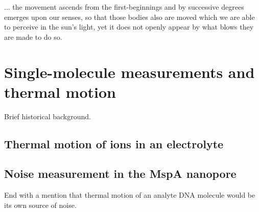 \begin{savequote}[75mm]
... the movement ascends from the first-beginnings and by successive degrees emerges upon our senses, so that those bodies also are moved which we are able to perceive in the sun's light, yet it does not openly appear by what blows they are made to do so.
\end{savequote}

\chapter{Single-molecule measurements and thermal motion}
\label{thermal_motion}

Brief historical background.

\section{Thermal motion of ions in an electrolyte}

\section{Noise measurement in the MspA nanopore}

End with a mention that thermal motion of an analyte DNA molecule would be its own source of noise.